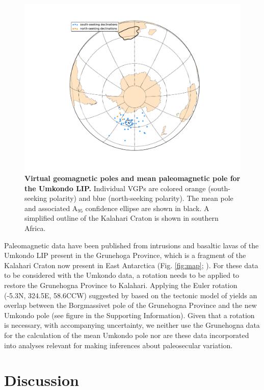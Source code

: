 \documentclass[11pt,letterpaper]{article}
\begin{document}
\begin{figure}[h!]
\includegraphics[width=5 in]{figures/Umkondo_mean_pole.pdf}
\caption{\textbf{ Virtual geomagnetic poles and mean paleomagnetic pole for the Umkondo LIP.} Individual VGPs are colored orange (south-seeking polarity) and blue (north-seeking polarity). The mean pole and associated A$_{95}$ confidence ellipse are shown in black. A simplified outline of the Kalahari Craton is shown in southern Africa.}
\label{fig:pole}
\end{figure}

Paleomagnetic data have been published from intrusions and basaltic lavas of the Umkondo LIP present in the Grunehoga Province, which is a fragment of the Kalahari Craton now present in East Antarctica (Fig. \ref{fig:map}; \cite{Powell2001a,Jones2003a}). For these data to be considered with the Umkondo data, a rotation needs to be applied to restore the Grunehogna Province to Kalahari. Applying the Euler rotation (-5.3\textdegree N, 324.5\textdegree E, 58.6\textdegree CCW) suggested by \cite{Evans2009a} based on the tectonic model of \cite{Jacobs2004a} yields an overlap between the Borgmassivet pole of the Grunehogna Province \citep{Jones2003a} and the new Umkondo pole (see figure in the Supporting Information). Given that a rotation is necessary, with accompanying uncertainty, we neither use the Grunehogna data for the calculation of the mean Umkondo pole nor are these data incorporated into analyses relevant for making inferences about paleosecular variation.

\section*{Discussion}
\end{document}
